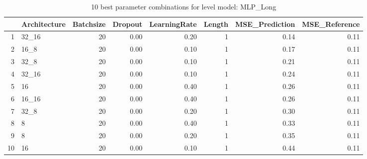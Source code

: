 \begin{table}[ht]
\centering
\begin{tabular}{rlrrrrrr}
  \hline
 & Architecture & Batchsize & Dropout & LearningRate & Length & MSE\_Prediction & MSE\_Reference \\ 
  \hline
1 & 32\_16 &  20 & 0.00 & 0.20 &   1 & 0.14 & 0.11 \\ 
  2 & 16\_8 &  20 & 0.00 & 0.10 &   1 & 0.17 & 0.11 \\ 
  3 & 32\_8 &  20 & 0.00 & 0.10 &   1 & 0.21 & 0.11 \\ 
  4 & 32\_16 &  20 & 0.00 & 0.10 &   1 & 0.24 & 0.11 \\ 
  5 & 16 &  20 & 0.00 & 0.40 &   1 & 0.26 & 0.11 \\ 
  6 & 16\_16 &  20 & 0.00 & 0.40 &   1 & 0.26 & 0.11 \\ 
  7 & 32\_8 &  20 & 0.00 & 0.20 &   1 & 0.30 & 0.11 \\ 
  8 & 8 &  20 & 0.00 & 0.40 &   1 & 0.33 & 0.11 \\ 
  9 & 8 &  20 & 0.00 & 0.20 &   1 & 0.35 & 0.11 \\ 
  10 & 16 &  20 & 0.00 & 0.10 &   1 & 0.44 & 0.11 \\ 
   \hline
\end{tabular}
\caption{10 best parameter combinations for level model: MLP_Long} 
\label{tab:MLP_Long_top_10}
\end{table}
